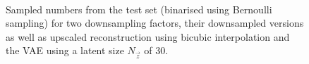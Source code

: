 \begin{figure}
    \centering
    \\
    \caption{
        Sampled numbers from the test set (binarised using Bernoulli sampling) for two downsampling factors,
        their downsampled versions as well as upscaled reconstruction using bicubic interpolation and the VAE using a latent size $N_{\vec{z}}$ of 30.
    }
    \label{fig:samples}
\end{figure}

